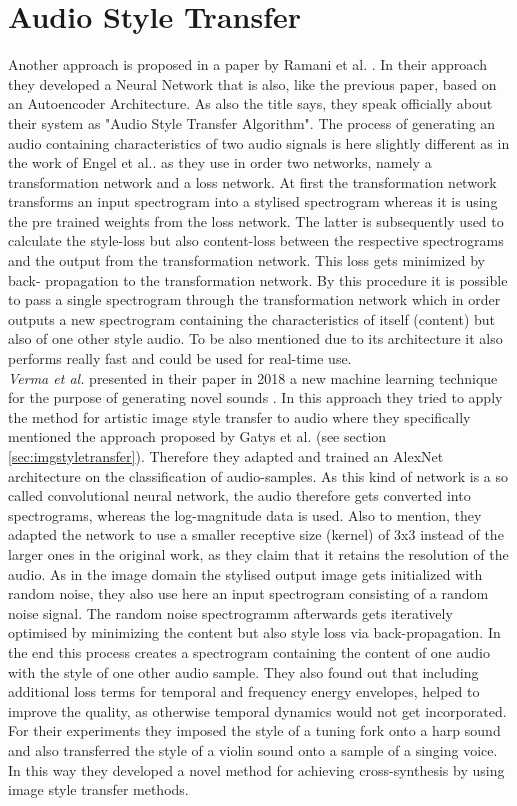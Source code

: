\section{Audio Style Transfer}
Another approach is proposed in a paper by Ramani et al. \cite{Ramani2018}. In their approach they developed a Neural Network that is also, like the previous paper, based on an Autoencoder Architecture. As also the title says, they speak officially about their system as "Audio Style Transfer Algorithm". The process of generating an audio containing characteristics of two audio signals is here slightly different as in the work of Engel et al.. as they use in order two networks, namely a transformation network and a loss network. At first the transformation network transforms an input spectrogram into a stylised spectrogram whereas it is using the pre trained weights from the loss network. The latter is subsequently used to calculate the style-loss but also content-loss between the respective spectrograms and the output from the transformation network. This loss gets minimized by back- propagation to the transformation network. By this procedure it is possible to pass a single spectrogram through the transformation network which in order outputs a new spectrogram containing the characteristics of itself (content) but also of one other style audio. To be also mentioned due to its architecture it also performs really fast and could be used for real-time use.\\

\textit{Verma et al.} presented in their paper in 2018 a new machine learning technique for the purpose of generating novel sounds \cite{verma2018neural}. In this approach they tried to apply the method for artistic image style transfer to audio where they specifically mentioned the approach proposed by Gatys et al.\cite{Gatys2016} (see section \ref{sec:imgstyletransfer}). Therefore they adapted and trained an AlexNet architecture on the classification of audio-samples. As this kind of network is a so called convolutional neural network, the audio therefore gets converted into spectrograms, whereas the log-magnitude data is used. Also to mention, they adapted the network to use a smaller receptive size (kernel) of 3x3 instead of the larger ones in the original work, as they claim that it retains the resolution of the audio. As in the image domain the stylised output image gets initialized with random noise, they also use here an input spectrogram consisting of a random noise signal. The random noise spectrogramm afterwards gets iteratively optimised by minimizing the content but also style loss via back-propagation. In the end this process creates a spectrogram containing the content of one audio with the style of one other audio sample. They also found out that including additional loss terms for temporal and frequency energy envelopes, helped to improve the quality, as otherwise temporal dynamics would not get incorporated. For their experiments they imposed the style of a tuning fork onto a harp sound and also transferred the style of a violin sound onto a sample of a singing voice. In this way they developed a novel method for achieving cross-synthesis by using image style transfer methods.\\

